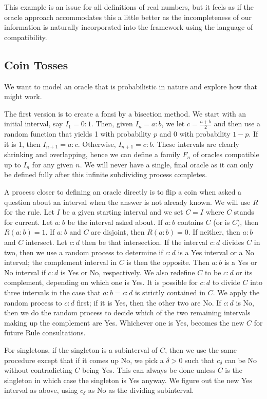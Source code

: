 \documentclass[12pt]{article}
\begin{document}
This example is an issue for all definitions of real numbers, but it feels as if the oracle approach accommodates this a little better as the incompleteness of our information is naturally incorporated into the framework using the language of compatibility.

\subsection{Coin Tosses}

We want to model an oracle that is probabilistic in nature and explore how that might work. 

The first version is to create a fonsi by a bisection method. We start with an initial interval, say $I_1 = 0:1$. Then, given $I_n = a:b$, we let $c = \tfrac{a+b}{2}$ and then use a random function that yields 1 with probability $p$ and 0 with probability $1-p$. If it is 1, then $I_{n+1} = a:c$. Otherwise, $I_{n+1} = c:b$. These intervals are clearly shrinking and overlapping, hence we can define a family $F_n$ of oracles compatible up to $I_n$ for any given $n$. We will never have a single, final oracle as it can only be defined fully after this infinite subdividing process completes. 

A process closer to defining an oracle directly is to flip a coin when asked a question about an interval when the answer is not already known. We will use $R$ for the rule. Let $I$ be a given starting interval and we set $C=I$ where $C$ stands for current. Let $a:b$ be the interval asked about. If $a:b$ contains $C$ (or is $C$), then $R(a:b) = 1$. If $a:b$ and $C$ are disjoint, then $R(a:b) = 0$. If neither, then $a:b$ and $C$ intersect. Let $c:d$ then be that intersection. If the interval $c:d$ divides $C$ in two, then we use a random process to determine if $c:d$ is a Yes interval or a No interval; the complement interval in $C$ is then the opposite. Then $a:b$ is a Yes or No interval if $c:d$ is Yes or No, respectively. We also redefine $C$ to be $c:d$ or its complement, depending on which one is Yes. It is possible for $c:d$ to divide $C$ into three intervals in the case that $a:b=c:d$ is strictly contained in $C$. We apply the random process to $c:d$ first; if it is Yes, then the other two are No. If $c:d$ is No, then we do the random process to decide which of the two remaining intervals making up the complement are Yes. Whichever one is Yes, becomes the new $C$ for future Rule consultations.   

For singletons, if the singleton is a subinterval of $C$, then we use the same procedure except that if it comes up No, we pick a $\delta > 0$ such that $c_\delta$ can be No without contradicting $C$ being Yes. This can always be done unless $C$ is the singleton in which case the singleton is Yes anyway. We figure out the new Yes interval as above, using $c_\delta$ as No as the dividing subinterval. 
\end{document}
